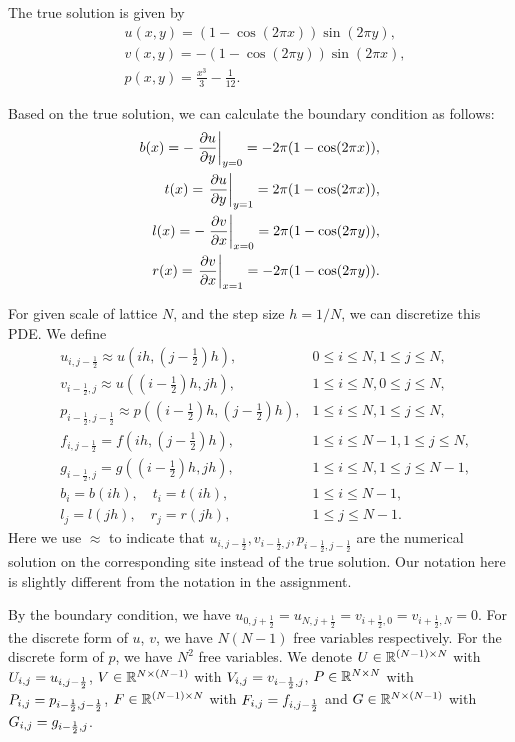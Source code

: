 \documentclass[english]{pkupaper}
\newenvironment{eqt}{\begin{equation}\begin{aligned}}{\end{aligned}\end{equation}}
\begin{document}
The true solution is given by
\begin{eqt}
\label{true_sol}
&u(x,y)=(1-\cos(2\pi x))\sin (2\pi y),\\
&v(x,y)=-(1-\cos(2\pi y))\sin (2\pi x),\\
&p(x,y)=\frac{x^3}{3}-\frac{1}{12}.
\end{eqt}

Based on the true solution, we can calculate the boundary condition as follows:
\begin{eqt}
b(x)=-\left.\frac{\p u}{\p y}\right|_{y=0}=-2\pi (1-\cos(2\pi x)),\\
t(x)=\left.\frac{\p u}{\p y}\right|_{y=1}=2\pi (1-\cos(2\pi x)),\\
l(x)=-\left.\frac{\p v}{\p x}\right|_{x=0}=2\pi (1-\cos(2\pi y)),\\
r(x)=\left.\frac{\p v}{\p x}\right|_{x=1}=-2\pi (1-\cos(2\pi y)).\\
\end{eqt}

For given scale of lattice $N$, and the step size $h=1/N$, we can discretize this PDE. We define
\begin{eqt}
&u_{i,j-\frac{1}{2}}\approx u(ih,(j-\frac{1}{2})h), \quad &0\leq i \leq N, 1\leq j\leq N,\\
&v_{i-\frac{1}{2},j}\approx u((i-\frac{1}{2})h,jh), &1\leq i \leq N, 0\leq j\leq N,\\
&p_{i-\frac{1}{2},j-\frac{1}{2}}\approx p((i-\frac{1}{2})h,(j-\frac{1}{2})h), &1\leq i \leq N, 1\leq j\leq N,\\
&f_{i,j-\frac{1}{2}}=f(ih,(j-\frac{1}{2})h), & 1\leq i \leq N-1, 1\leq j\leq N,\\
&g_{i-\frac{1}{2},j}=g((i-\frac{1}{2})h,jh), & 1\leq i \leq N, 1\leq j\leq N-1,\\
&b_i=b(ih), \quad t_i=t(ih), & 1\leq i\leq N-1,\\
&l_j=l(jh), \quad r_j=r(jh), & 1\leq j\leq N-1.
\end{eqt}
Here we use $\approx$ to indicate that $u_{i,j-\frac{1}{2}}, v_{i-\frac{1}{2},j}, p_{i-\frac{1}{2},j-\frac{1}{2}}$ are the numerical solution on the corresponding site instead of the true solution. Our notation here is slightly different from the notation in the assignment. 

By the boundary condition, we have $u_{0,j+\frac{1}{2}}=u_{N,j+\frac{1}{2}}=v_{i+\frac{1}{2},0}=v_{i+\frac{1}{2},N}=0$. For the discrete form of $u$, $v$, we have $N(N-1)$ free variables respectively. For the discrete form of $p$, we have $N^2$ free variables. We denote $U\in\mathbb{R}^{(N-1)\times N}$ with $U_{i,j}=u_{i,j-\frac{1}{2}}$, $V\in \mathbb{R}^{N\times(N-1)}$ with $V_{i,j}=v_{i-\frac{1}{2},j}$,  $P\in\mathbb{R}^{N\times N}$ with $P_{i,j}=p_{i-\frac{1}{2},j-\frac{1}{2}}$, $F\in\mathbb{R}^{(N-1)\times N}$ with $F_{i,j}=f_{i,j-\frac{1}{2}}$ and $G\in \mathbb{R}^{N\times(N-1)}$ with $G_{i,j}=g_{i-\frac{1}{2},j}$.
\end{document}

